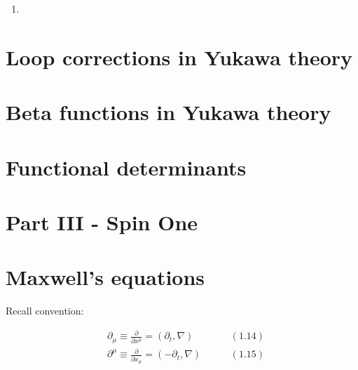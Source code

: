 \documentclass[twoside]{amsart}
\begin{document}
\begin{enumerate}
where the following useful facts were used:
\[
\begin{aligned}
  & u_-(\mathbf{p}) = \left( \begin{matrix} \phi_a \\ \, \end{matrix} \right)  \quad \quad \, (50.8) \\ 
 & \overline{u}_-(\mathbf{p}) = ( \begin{matrix} & \phi_{\dot{a}}^* \end{matrix}) \quad \quad \, (50.10) \\ 
  & u_+(\mathbf{p}) = \left( \begin{matrix}  \,  \\ \phi^{ * \dot{a}} \end{matrix} \right) \quad \quad \, (50.13) \\ 
  & \overline{u}_+(\mathbf{p}) = ( \begin{matrix} \phi^a & \end{matrix} ) \quad \quad \, (50.14 )
\end{aligned}
\]
\[
\Longrightarrow - \not p = + \left( |p \rangle [ p | + | p ] \langle p | \right)
\]
\item[(b)] 
\end{enumerate}

\section{Loop corrections in Yukawa theory}

\section{Beta functions in Yukawa theory}

\section{Functional determinants}

\section*{Part III - Spin One}

\section{Maxwell's equations}

Recall convention: 

\begin{align}
  &  \partial_{\mu} \equiv \frac{ \partial }{ \partial x^{\mu} }   = ( \partial_t, \nabla ) \quad \quad \, & (1.14)  \\
  & \partial^{\mu} \equiv \frac{ \partial }{ \partial x_{\mu}  }  = ( -\partial_t , \nabla ) \quad \quad \, & (1.15) 
\end{align}
\end{document}
